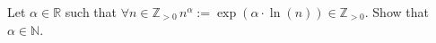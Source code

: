 \begin{problem}
    Let \( \alpha\in\mathbb{R} \) such that \( \forall n\in\mathbb{Z}_{>0}\, n^\alpha:=\exp\left(\alpha\cdot\ln\left(n\right)\right)\in\mathbb{Z}_{>0} \). Show that \( \alpha\in\mathbb{N} \).
\end{problem}
